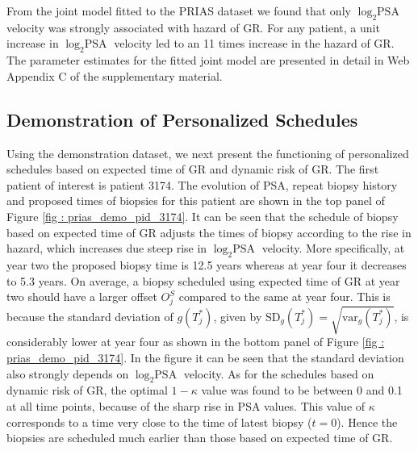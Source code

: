 From the joint model fitted to the PRIAS dataset we found that only $\log_2 \mbox{PSA}$ velocity was strongly associated with hazard of GR. For any patient, a unit increase in $\log_2 \mbox{PSA}$ velocity led to an 11 times increase in the hazard of GR. The parameter estimates for the fitted joint model are presented in detail in Web Appendix C of the supplementary material. 

\subsection{Demonstration of Personalized Schedules}
\label{subsec : demo_prias_pers_schedule}
Using the demonstration dataset, we next present the functioning of personalized schedules based on expected time of GR and dynamic risk of GR. The first patient of interest is patient 3174. The evolution of PSA, repeat biopsy history and proposed times of biopsies for this patient are shown in the top panel of Figure \ref{fig : prias_demo_pid_3174}. It can be seen that the schedule of biopsy based on expected time of GR adjusts the times of biopsy according to the rise in hazard, which increases due steep rise in $\log_2 \mbox{PSA}$ velocity. More specifically, at year two the proposed biopsy time is 12.5 years whereas at year four it decreases to 5.3 years. On average, a biopsy scheduled using expected time of GR at year two should have a larger offset $O^S_j$ compared to the same at year four. This is because the standard deviation of $g(T^*_j)$, given by $\mbox{SD}_g(T^*_j) = \sqrt{\mbox{var}_g(T^*_j)}$, is considerably lower at year four as shown in the bottom panel of Figure \ref{fig : prias_demo_pid_3174}. In the figure it can be seen that the standard deviation also strongly depends on $\log_2 \mbox{PSA}$ velocity. As for the schedules based on dynamic risk of GR, the optimal $1 - \kappa$ value was found to be between 0 and 0.1 at all time points, because of the sharp rise in PSA values. This value of $\kappa$ corresponds to a time very close to the time of latest biopsy ($t=0$). Hence the biopsies are scheduled much earlier than those based on expected time of GR.


